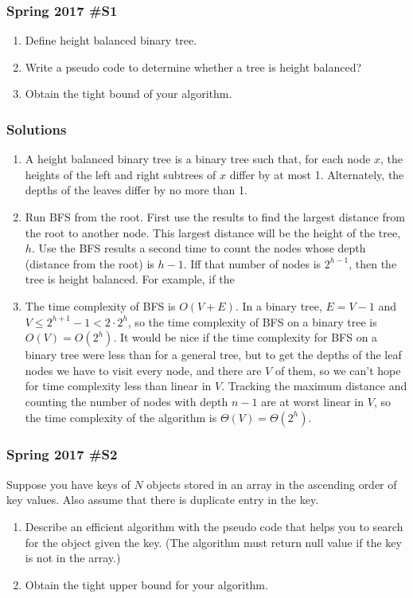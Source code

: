\subsubsection{Spring 2017 \#S1}
	\begin{enumerate}[label=\alph*.]
		\item Define height balanced binary tree.
		\item Write a pseudo code to determine whether a tree is height balanced?
		\item Obtain the tight bound of your algorithm.
	\end{enumerate}

\subsubsection{Solutions}

\begin{enumerate}[label=\alph*.]
	\item A height balanced binary tree is a binary tree such that, for each node $x$, the heights of the left and right subtrees of $x$ differ by at most 1.  Alternately, the depths of the leaves differ by no more than 1.  
	\item Run BFS from the root.  First use the results to find the largest distance from the root to another node.   This largest distance will be the height of the tree, $h$.  Use the BFS results a second time to count the nodes whose depth (distance from the root) is $h-1$.  Iff that number of nodes is $2^{h-1}$, then the tree is height balanced.  For example, if the 
	\item The time complexity of BFS is $O(V+E)$.  In a binary tree, $E = V-1$ and $V \le 2^{h+1}-1 < 2 \cdot 2^h$, so the time complexity of BFS on a binary tree is $O(V) = O(2^h)$.  It would be nice if the time complexity for BFS on a binary tree were less than for a general tree, but to get the depths of the leaf nodes we have to visit every node, and there are $V$ of them, so we can't hope for time complexity less than linear in $V$.  Tracking the maximum distance and counting the number of nodes with depth $n-1$ are at worst linear in $V$, so the time complexity of the algorithm is $\Theta(V) = \Theta(2^h)$.  
\end{enumerate}

\subsubsection{Spring 2017 \#S2}
	Suppose you have keys of $N$ objects stored in an array in the ascending order of key values.  Also assume that there is duplicate entry in the key.  
	\begin{enumerate}[label=\alph*.]
		\item Describe an efficient algorithm with the pseudo code that helps you to search for the object given the key. (The algorithm must return null value if the key is not in the array.) 
		\item Obtain the tight upper bound for your algorithm.
	\end{enumerate}
	

